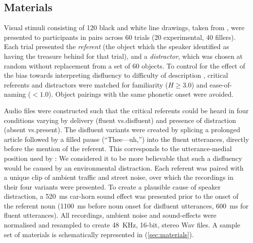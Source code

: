 \documentclass[a4paper,man,natbib]{apa6}
\newcommand*{\spex}[1]{``{#1}''} %
\begin{document}
\subsection{Materials}
Visual stimuli consisting of 120 black and white line drawings, taken from \citet{Snodgrass1980}, were presented to participants in pairs across 60 trials (20 experimental, 40 fillers). 
Each trial presented the \textit{referent} (the object which the speaker identified as having the treasure behind for that trial), and a \textit{distractor}, which was chosen at random without replacement from a set of 60 objects. 
To control for the effect of the bias towards interpreting disfluency to difficulty of description \citep{Arnold2007}, critical referents and distractors were matched for familiarity ($H \ge 3.0$)
and ease-of-naming ($<1.0$). 
Object pairings with the same phonetic onset were avoided. 

Audio files were constructed such that the critical referents could be heard in four conditions varying by delivery (fluent vs.\@ disfluent) and presence of distraction (absent vs.\@ present). 
The disfluent variants were created by splicing a prolonged article followed by a filled pause (\spex{Thee---uh,}) into the fluent utterances, directly before the mention of the referent.
This corresponds to the utterance-medial position used by \citet{Loy2016}:
We considered it to be more believable that such a disfluency would be caused by an environmental distraction.
Each referent was paired with a unique clip of ambient traffic and street noise, over which the recordings in their four variants were presented.
To create a plausible cause of speaker distraction, a 520~ms car-horn sound effect was presented prior to the onset of the referent noun (1100~ms before noun onset for disfluent utterances, 600~ms for fluent utterances). 
All recordings, ambient noise and sound-effects were normalised and resampled to create 48~KHz, 16-bit, stereo Wav files.
A sample set of materials is schematically represented in (\ref{sec:materials}).
\end{document}
